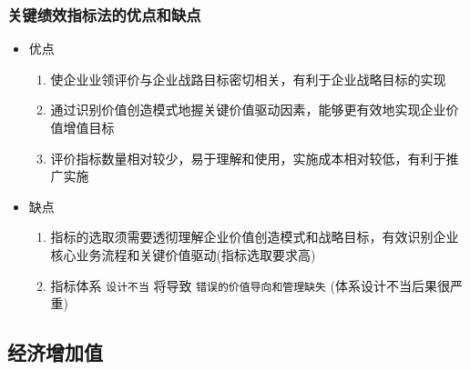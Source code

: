 \documentclass[11pt]{article}
\begin{document}
\subsubsection{关键绩效指标法的优点和缺点}
\label{sec:org85de1de}
\begin{itemize}
\item 优点
\begin{enumerate}
\item 使企业业领评价与企业战路目标密切相关，有利于企业战略目标的实现
\item 通过识别价值创造模式地握关键价值驱动因素，能够更有效地实现企业价值增值目标
\item 评价指标数量相对较少，易于理解和使用，实施成本相对较低，有利于推广实施
\end{enumerate}
\item 缺点
\begin{enumerate}
\item 指标的选取须需要透彻理解企业价值创造模式和战略目标，有效识别企业核心业务流程和关键价值驱动(指标选取要求高)
\item 指标体系 \texttt{设计不当} 将导致 \texttt{错误的价值导向和管理缺失} (体系设计不当后果很严重)
\end{enumerate}
\end{itemize}
\subsection{经济增加值}
\label{sec:org7be2d34}
\end{document}

